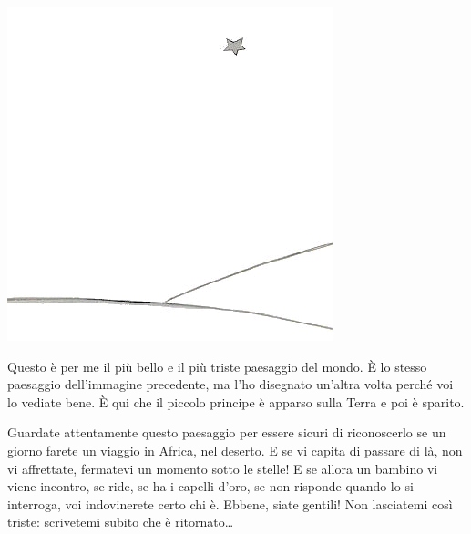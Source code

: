 \documentclass[11pt]{scrbook}
\begin{document}
\begin{center}
\includegraphics{img/27a}
\end{center}

Questo è per me il più bello e il più triste paesaggio del mondo. È lo stesso paesaggio dell'immagine precedente, ma l'ho disegnato un'altra volta perché voi lo vediate bene. È qui che il piccolo principe è apparso sulla Terra e poi è sparito.

Guardate attentamente questo paesaggio per essere sicuri di riconoscerlo se un giorno farete un viaggio in Africa, nel deserto. E se vi capita di passare di là, non vi affrettate, fermatevi un momento sotto le stelle! E se allora un bambino vi viene incontro, se ride, se ha i capelli d'oro, se non risponde quando lo si interroga, voi indovinerete certo chi è. Ebbene, siate gentili! Non lasciatemi così triste: scrivetemi subito che è ritornato\ldots{}
\end{document}
